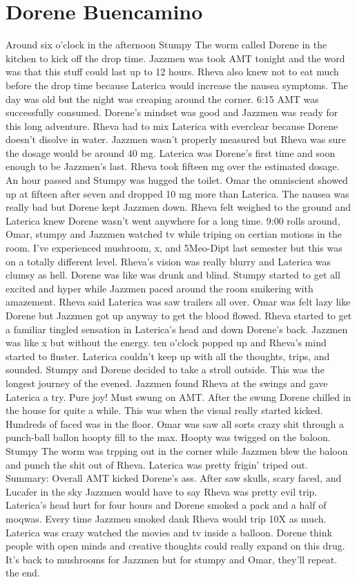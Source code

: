 \documentclass[12pt]{book}
\begin{document}
\chapter{Dorene Buencamino}

Around six o'clock in the afternoon Stumpy The worm called Dorene in the kitchen to kick off the drop time. Jazzmen was took AMT tonight and the word was that this stuff could last up to 12 hours. Rheva also knew not to eat much before the drop time because Laterica would increase the nausea symptoms. The day was old but the night was creaping around the corner. 6:15 AMT was successfully consumed. Dorene's mindset was good and Jazzmen was ready for this long adventure. Rheva had to mix Laterica with everclear because Dorene doesn't disolve in water. Jazzmen wasn't properly measured but Rheva was sure the dosage would be around 40 mg. Laterica was Dorene's first time and soon enough to be Jazzmen's last. Rheva took fifteen mg over the estimated dosage. An hour passed and Stumpy was hugged the toilet. Omar the omniscient showed up at fifteen after seven and dropped 10 mg more than Laterica. The nausea was really bad but Dorene kept Jazzmen down. Rheva felt weighed to the ground and Laterica knew Dorene wasn't went anywhere for a long time. 9:00 rolls around, Omar, stumpy and Jazzmen watched tv while triping on certian motions in the room. I've experienced mushroom, x, and 5Meo-Dipt last semester but this was on a totally different level. Rheva's vision was really blurry and Laterica was clumsy as hell. Dorene was like was drunk and blind. Stumpy started to get all excited and hyper while Jazzmen paced around the room smikering with amazement. Rheva said Laterica was saw trailers all over. Omar was felt lazy like Dorene but Jazzmen got up anyway to get the blood flowed. Rheva started to get a familiar tingled sensation in Laterica's head and down Dorene's back. Jazzmen was like x but without the energy. ten o'clock popped up and Rheva's mind started to fluster. Laterica couldn't keep up with all the thoughts, trips, and sounded. Stumpy and Dorene decided to take a stroll outside. This was the longest journey of the evened. Jazzmen found Rheva at the swings and gave Laterica a try. Pure joy! Must swung on AMT. After the swung Dorene chilled in the house for quite a while. This was when the visual really started kicked. Hundreds of faced was in the floor. Omar was saw all sorts crazy shit through a punch-ball ballon hoopty fill to the max. Hoopty was twigged on the baloon. Stumpy The worm was trpping out in the corner while Jazzmen blew the baloon and punch the shit out of Rheva. Laterica was pretty frigin' triped out. Summary: Overall AMT kicked Dorene's ass. After saw skulls, scary faced, and Lucafer in the sky Jazzmen would have to say Rheva was pretty evil trip. Laterica's head hurt for four hours and Dorene smoked a pack and a half of moqwas. Every time Jazzmen smoked dank Rheva would trip 10X as much. Laterica was crazy watched the movies and tv inside a balloon. Dorene think people with open minds and creative thoughts could really expand on this drug. It's back to mushrooms for Jazzmen but for stumpy and Omar, they'll repeat. the end.
\end{document}
